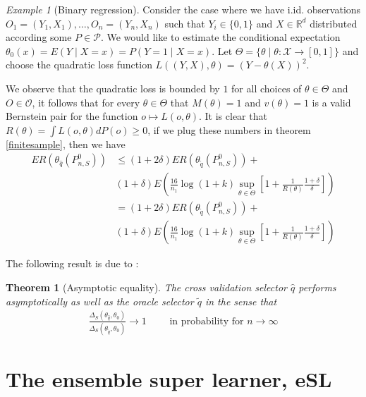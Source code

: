 \documentclass[11pt, a4paper]{article}
\newtheorem{theorem}{Theorem}
\theoremstyle{definition}
\theoremstyle{remark}
\newtheorem{example}{Example}
\newcommand{\cl}{q}
\begin{document}
\begin{example}[Binary regression]
    Consider the case where we have i.id. observations $ O_1 = (Y_1 , X_1) , \dots , O_n = (Y_n , X_n) $ such that $ Y_i \in \{0, 1\} $ and $ X \in \mathbb{R}^{d} $ distributed according some $ P \in \mathcal{P} $. We would like to estimate the conditional expectation $ \theta_0(x) = E(Y \mid X = x) = P(Y = 1 \mid X = x) $.  Let $ \Theta = \{\theta \mid \theta : \mathcal{X} \to [0,1] \}  $ and choose the quadratic loss function $ L((Y, X), \theta) = (Y - \theta(X))^2 $.

    We observe that the quadratic loss is bounded by $ 1 $ for all choices of $ \theta \in \Theta $ and $ O \in \mathcal{O} $, it follows that for every $ \theta \in \Theta $ that $ M(\theta) = 1 $ and $ v(\theta) = 1 $ is a valid Bernstein pair for the function $ o \mapsto L(o, \theta)$. It is clear that $ R(\theta) = \int L(o , \theta) d P(o) \geq 0  $, if we plug these numbers in theorem \ref{finitesample}, then we have 
    \begin{align*}
       ER(\theta_{\hat{\cl}}(P_{n, S}^{0})) &\leq(1 + 2 \delta) ER(\theta_{ \tilde{\cl}}(P_{n,S}^{0})) +\\
                                                &(1 + \delta) E \left(  \frac{16}{n_1} \log (1 +k) \sup_{\theta \in \Theta} \left[ 1+ \frac{1}{R(\theta)} \frac{1 + \delta}{\delta}\right]\right)\\
                                                &= (1 + 2 \delta) ER(\theta_{ \tilde{\cl}}(P_{n,S}^{0})) +\\
&(1 + \delta) E \left(  \frac{16}{n_1} \log (1 +k) \sup_{\theta \in \Theta} \left[ 1 + \frac{1}{R(\theta)} \frac{1 + \delta}{\delta}\right]\right)
    \end{align*}
\end{example}


The following result is due to \cite{laan03}: 
\begin{theorem}[Asymptotic equality]
    The cross validation selector $ \hat{\cl} $ performs asymptotically as well as the oracle selector $ \tilde{\cl} $ in the sense that 
    \begin{align*}
        \frac{\Delta_{S}( \theta_{ \hat{\cl} } , \theta_0 )}{ \Delta_{S}( \theta_{ \tilde{\cl} } , \theta_0) } \to 1 \qquad \text{ in probability for } n \to \infty
    \end{align*}
\end{theorem}


\section{The ensemble super learner, eSL}
\end{document}
